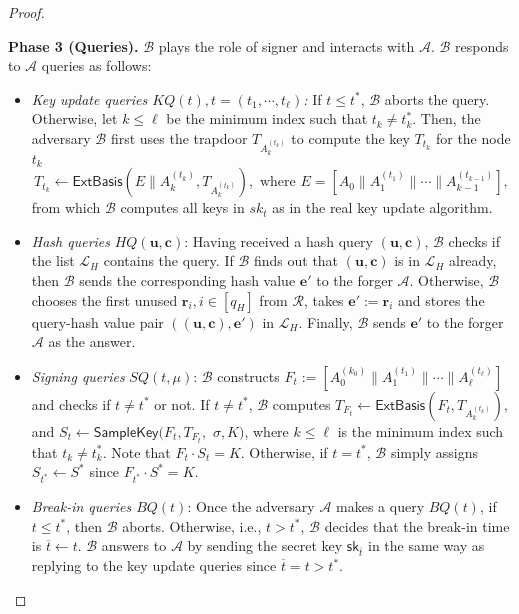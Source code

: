 \documentclass[runningheads]{llncs}
\def\cal{\mathcal}
\def\bf{\mathbf}
\def\ExtBasis{\mathsf{ExtBasis}}
\begin{document}
\begin{proof}
\begin{description}
\item  \textbf{Phase 3 (Queries).} 
$\cal{B}$  plays the role of signer and interacts with  $\cal{A}$.
$\cal{B}$ responds to $\cal{A}$ queries as follows:
\begin{itemize}
\item \textit{Key update queries $KQ(t),t= (t_1, \cdots, t_\ell)$:}  If $t\leq t^*$, $\cal{B}$ aborts the query. 
Otherwise, let $k\leq \ell$ be the minimum index such that $t_k \neq t^*_k$. 
Then, the adversary $\cal{B}$ first uses the trapdoor $T_{A_k^{(t_k)}}$ to compute the key $T_{t_k}$ for the node $t_k$  
\[
T_{t_k} \leftarrow \ExtBasis(E\|A_k^{(t_k)}, T_{A_k^{(t_k)}}), \text{ where } E = \left[ A_0 \|A_1^{(t_1)} \| \cdots \|A_{k-1}^{(t_{k-1})} \right],
\]
 from which $\cal{B}$ computes all keys in $sk_t$ as in the real key update algorithm.  
\item \textit{Hash queries} $HQ(\bf{u},\bf{c})$: 	
Having received a hash query $(\mathbf{u}, \bf{c})$, 
$\mathcal{B}$ checks if the list $\cal{L}_H$ contains the query.
If $\mathcal{B}$ finds out that $(\mathbf{u}, \bf{c})$ is in $\cal{L}_H$ already, then $\mathcal{B}$ 
sends the corresponding hash value $\mathbf{e}'$ to the forger $\mathcal{A}$. 
Otherwise, $\mathcal{B}$ chooses the first unused $\mathbf{r}_i, i\in [q_H]$ from $\mathcal{R}$, 
takes $\mathbf{e}':=\mathbf{r}_i$ and stores the query-hash value pair $((\mathbf{u}, \bf{c}), \mathbf{e}')$ in $\cal{L}_H$.  
Finally, $\mathcal{B}$ sends $\mathbf{e}'$ to the forger $\mathcal{A}$ as the answer. 
\item \textit{Signing queries} 
$SQ(t,\mu)$: $\cal{B}$ constructs $F_{t}:=\left[A_0^{(k_0)}\| A_1^{(t_1)} \| \cdots \|A_\ell^{(t_\ell)} \right]$ 
and checks if $t\neq t^*$ or not. 
 If  $t\neq t^*$,  $\cal{B}$ computes 
 $T_{F_t} \leftarrow \ExtBasis(F_{t}, T_{A_k^{(t_k)}}),$ 
 and $S_t \leftarrow \mathsf{SampleKey}(F_{t}, T_{F_t}, $ $ \sigma, K)$, 
 where $k \leq \ell$ is the minimum index such that $t_k \neq t^*_k$.
 Note that  $F_t\cdot S_t=K$.
 Otherwise, if $t= t^*$, $\cal{B}$ simply assigns $S_{t^*} \leftarrow S^*$ since $F_{t^*}\cdot S^*=K$.

\item \textit{Break-in queries $BQ(t)$}: 
Once the adversary $\cal{A}$ makes a query $BQ(t)$, if $t\leq t^*$, then $\cal{B}$ aborts. 
Otherwise, i.e., $t>t^*$, $\cal{B}$ decides that the break-in time is $\overline{t} \leftarrow t$. $\cal{B}$
answers to $\cal{A}$ by sending the secret key $\mathsf{sk}_{\overline{t}}$ in the same way 
as replying to the key update queries since $\overline{t}= t>t^*$. 
\end{itemize}


\end{description}
\end{proof}
\end{document}
